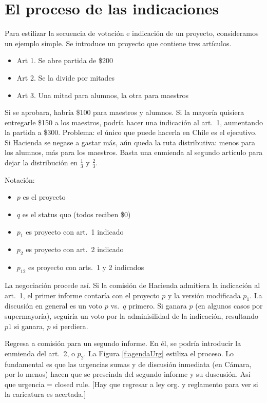 \section{El proceso de las indicaciones}

Para estilizar la secuencia de votación e indicación de un proyecto, consideramos un ejemplo simple. Se introduce un proyecto que contiene tres artículos. 

\begin{itemize}
\item Art 1. Se abre partida de \$200
\item Art 2. Se la divide por mitades
\item Art 3. Una mitad para alumnos, la otra para maestros
\end{itemize}

\noindent Si se aprobara, habría \$100 para maestros y alumnos. Si la mayoría quisiera entregarle \$150 a los maestros, podría hacer una indicación al art.\ 1, aumentando la partida a \$300. Problema: el único que puede hacerla en Chile es el ejecutivo. Si Hacienda se negase a gastar más, aún queda la ruta distributiva: menos para los alumnos, más para los maestros. Basta una enmienda al segundo artículo para dejar la distribución en $\frac{1}{3}$ y $\frac{2}{3}$. 

Notación:
\begin{itemize}
\item $p$ es el proyecto
\item $q$ es el status quo (todos reciben \$0)
\item $p_1$ es proyecto con art.\ 1 indicado
\item $p_2$ es proyecto con art.\ 2 indicado
\item $p_{12}$ es proyecto con arts.\ 1 y 2 indicados
\end{itemize}

La negociación procede así. Si la comisión de Hacienda admitiera la indicación al art.\ 1, el primer informe contaría con el proyecto $p$ y la versión modificada $p_1$. La discusión en general es un voto $p$ vs.\ $q$ primero. Si ganara $p$ (en algunos casos por supermayoría), seguiría un voto por la adminisilidad de la indicación, resultando $p1$ si ganara, $p$ si perdiera.

Regresa a comisión para un segundo informe. En él, se podría introducir la enmienda del art.\ 2, o $p_2$. La Figura \ref{f:agendaUrg} estiliza el proceso. Lo fundamental es que las urgencias sumas y de discusión inmediata (en Cámara, por lo menos) hacen que se prescinda del segundo informe y su duscusión. Así que urgencia = closed rule. [Hay que regresar a ley org. y reglamento para ver si la caricatura es acertada.]

